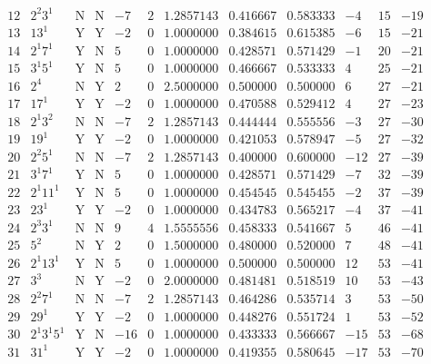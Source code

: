 \documentclass[11pt,reqno,a4letter]{article}
\numberwithin{figure}{section}
\numberwithin{table}{section}
\theoremstyle{plain}
\numberwithin{theorem}{section}
\theoremstyle{definition}
\begin{document}
\begin{table}[h!]
\begin{equation*}
{\begin{array}{cc|cc|ccc|cc|ccc}
 12 & 2^2 3^1 & \text{N} & \text{N} & -7 & 2 & 1.2857143 & 0.416667 & 0.583333 & -4 & 15 & -19 \\
 13 & 13^1 & \text{Y} & \text{Y} & -2 & 0 & 1.0000000 & 0.384615 & 0.615385 & -6 & 15 & -21 \\
 14 & 2^1 7^1 & \text{Y} & \text{N} & 5 & 0 & 1.0000000 & 0.428571 & 0.571429 & -1 & 20 & -21 \\
 15 & 3^1 5^1 & \text{Y} & \text{N} & 5 & 0 & 1.0000000 & 0.466667 & 0.533333 & 4 & 25 & -21 \\
 16 & 2^4 & \text{N} & \text{Y} & 2 & 0 & 2.5000000 & 0.500000 & 0.500000 & 6 & 27 & -21 \\
 17 & 17^1 & \text{Y} & \text{Y} & -2 & 0 & 1.0000000 & 0.470588 & 0.529412 & 4 & 27 & -23 \\
 18 & 2^1 3^2 & \text{N} & \text{N} & -7 & 2 & 1.2857143 & 0.444444 & 0.555556 & -3 & 27 & -30 \\
 19 & 19^1 & \text{Y} & \text{Y} & -2 & 0 & 1.0000000 & 0.421053 & 0.578947 & -5 & 27 & -32 \\
 20 & 2^2 5^1 & \text{N} & \text{N} & -7 & 2 & 1.2857143 & 0.400000 & 0.600000 & -12 & 27 & -39 \\
 21 & 3^1 7^1 & \text{Y} & \text{N} & 5 & 0 & 1.0000000 & 0.428571 & 0.571429 & -7 & 32 & -39 \\
 22 & 2^1 11^1 & \text{Y} & \text{N} & 5 & 0 & 1.0000000 & 0.454545 & 0.545455 & -2 & 37 & -39 \\
 23 & 23^1 & \text{Y} & \text{Y} & -2 & 0 & 1.0000000 & 0.434783 & 0.565217 & -4 & 37 & -41 \\
 24 & 2^3 3^1 & \text{N} & \text{N} & 9 & 4 & 1.5555556 & 0.458333 & 0.541667 & 5 & 46 & -41 \\
 25 & 5^2 & \text{N} & \text{Y} & 2 & 0 & 1.5000000 & 0.480000 & 0.520000 & 7 & 48 & -41 \\
 26 & 2^1 13^1 & \text{Y} & \text{N} & 5 & 0 & 1.0000000 & 0.500000 & 0.500000 & 12 & 53 & -41 \\
 27 & 3^3 & \text{N} & \text{Y} & -2 & 0 & 2.0000000 & 0.481481 & 0.518519 & 10 & 53 & -43 \\
 28 & 2^2 7^1 & \text{N} & \text{N} & -7 & 2 & 1.2857143 & 0.464286 & 0.535714 & 3 & 53 & -50 \\
 29 & 29^1 & \text{Y} & \text{Y} & -2 & 0 & 1.0000000 & 0.448276 & 0.551724 & 1 & 53 & -52 \\
 30 & 2^1 3^1 5^1 & \text{Y} & \text{N} & -16 & 0 & 1.0000000 & 0.433333 & 0.566667 & -15 & 53 & -68 \\
 31 & 31^1 & \text{Y} & \text{Y} & -2 & 0 & 1.0000000 & 0.419355 & 0.580645 & -17 & 53 & -70 \\

\end{array}}
\end{equation*}
\end{table}
\end{document}

